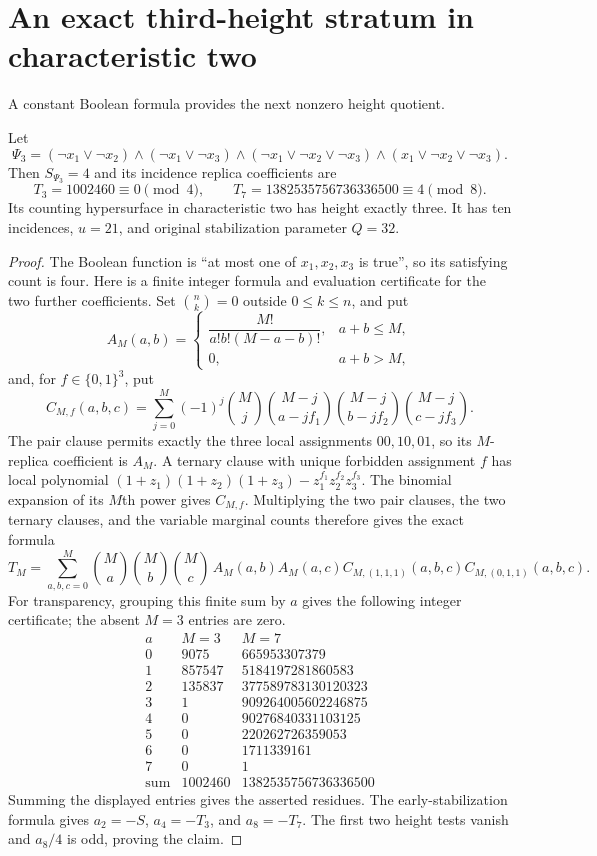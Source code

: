 \section{An exact third-height stratum in characteristic two}
A constant Boolean formula provides the next nonzero height quotient.
\begin{proposition}
Let
\[
 \Psi_3=(\neg x_1\vee\neg x_2)\wedge
 (\neg x_1\vee\neg x_3)\wedge
 (\neg x_1\vee\neg x_2\vee\neg x_3)\wedge
 (x_1\vee\neg x_2\vee\neg x_3).
\]
Then $S_{\Psi_3}=4$ and its incidence replica coefficients are
\[
 T_3=1002460\equiv0\pmod4,\qquad
 T_7=1382535756736336500\equiv4\pmod8.
\]
Its counting hypersurface in characteristic two has height exactly
three.  It has ten incidences, $u=21$, and original stabilization
parameter $Q=32$.
\end{proposition}
\begin{proof}
The Boolean function is ``at most one of $x_1,x_2,x_3$ is true'',
so its satisfying count is four.  Here is a finite integer formula
and evaluation certificate for the two further coefficients.
Set $\binom nk=0$ outside $0\leq k\leq n$, and put
\[
 A_M(a,b)=
 \begin{cases}
 \dfrac{M!}{a!b!(M-a-b)!},&a+b\leq M,\\
 0,&a+b>M,
 \end{cases}
\]
and, for $f\in\{0,1\}^3$, put
\[
 C_{M,f}(a,b,c)=\sum_{j=0}^M(-1)^j\binom Mj
 \binom{M-j}{a-jf_1}\binom{M-j}{b-jf_2}
 \binom{M-j}{c-jf_3}.
\]
The pair clause permits exactly the three local assignments
$00,10,01$, so its $M$-replica coefficient is $A_M$.
A ternary clause with unique forbidden assignment $f$ has local
polynomial
$(1+z_1)(1+z_2)(1+z_3)-z_1^{f_1}z_2^{f_2}z_3^{f_3}$.
The binomial expansion of its $M$th power gives $C_{M,f}$.
Multiplying the two pair clauses, the two ternary clauses, and
the variable marginal counts therefore gives the exact formula
\[
 T_M=\sum_{a,b,c=0}^M
 \binom Ma\binom Mb\binom Mc\,
 A_M(a,b)A_M(a,c)C_{M,(1,1,1)}(a,b,c)
 C_{M,(0,1,1)}(a,b,c).
\]
For transparency, grouping this finite sum by $a$ gives the
following integer certificate; the absent $M=3$ entries are zero.
\[
\begin{array}{c|r|r}
 a&M=3&M=7\\\hline
 0&9075&665953307379\\
 1&857547&5184197281860583\\
 2&135837&377589783130120323\\
 3&1&909264005602246875\\
 4&0&90276840331103125\\
 5&0&220262726359053\\
 6&0&1711339161\\
 7&0&1\\\hline
 \text{sum}&1002460&1382535756736336500
\end{array}
\]
Summing the displayed entries gives the asserted residues. The early-stabilization
formula gives $a_2=-S$, $a_4=-T_3$, and $a_8=-T_7$.
The first two height tests vanish and $a_8/4$ is odd, proving the claim.
\end{proof}


